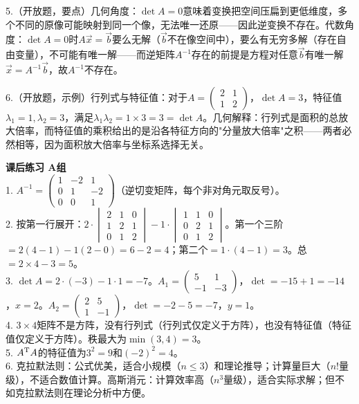 5.（开放题，要点）几何角度：$\det A=0$意味着变换把空间压扁到更低维度，多个不同的原像可能映射到同一个像，无法唯一还原——因此逆变换不存在。代数角度：$\det A=0$时$A\vec x=\vec b$要么无解（$\vec b$不在像空间中），要么有无穷多解（存在自由变量），不可能有唯一解——而逆矩阵$A^{-1}$存在的前提是方程对任意$\vec b$有唯一解$\vec x=A^{-1}\vec b$，故$A^{-1}$不存在。

6.（开放题，示例）行列式与特征值：对于$A=\begin{pmatrix}2&1\\1&2\end{pmatrix}$，$\det A=3$，特征值$\lambda_1=1,\lambda_2=3$，满足$\lambda_1\lambda_2=1\times3=3=\det A$。几何解释：行列式是面积的总放大倍率，而特征值的乘积给出的是沿各特征方向的"分量放大倍率"之积——两者必然相等，因为面积放大倍率与坐标系选择无关。

\noindent\textbf{课后练习 A组}\\
1. $A^{-1}=\begin{pmatrix}1&-2&1\\0&1&-2\\0&0&1\end{pmatrix}$（逆切变矩阵，每个非对角元取反号）。\\
2. 按第一行展开：$2\cdot\begin{vmatrix}2&1&0\\1&2&1\\0&1&2\end{vmatrix}-1\cdot\begin{vmatrix}1&1&0\\0&2&1\\0&1&2\end{vmatrix}$。第一个三阶$=2(4-1)-1(2-0)=6-2=4$；第二个$=1\cdot(4-1)=3$。总$=2\times4-3=5$。\\
3. $\det A=2\cdot(-3)-1\cdot1=-7$。$A_1=\begin{pmatrix}5&1\\-1&-3\end{pmatrix}$，$\det=-15+1=-14$，$x=2$。$A_2=\begin{pmatrix}2&5\\1&-1\end{pmatrix}$，$\det=-2-5=-7$，$y=1$。\\
4. $3\times4$矩阵不是方阵，没有行列式（行列式仅定义于方阵），也没有特征值（特征值仅定义于方阵）。秩最大为$\min(3,4)=3$。\\
5. $A^{\text T}A$的特征值为$3^2=9$和$(-2)^2=4$。\\
6. 克拉默法则：公式优美，适合小规模（$n\leq3$）和理论推导；计算量巨大（$n!$量级），不适合数值计算。高斯消元：计算效率高（$n^3$量级），适合实际求解；但不如克拉默法则在理论分析中方便。

